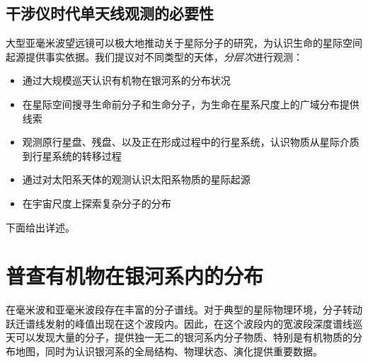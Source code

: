 \documentclass[a4paper]{article}
\begin{document}
\subsection{干涉仪时代单天线观测的必要性}

大型亚毫米波望远镜可以极大地推动关于星际分子的研究，为认识生命的星际空间起源提供事实依据。我们提议对不同类型的天体，\emph{分层次}进行观测：
\begin{itemize}
  \item 通过大规模巡天认识有机物在银河系的分布状况
  \item 在星际空间搜寻生命前分子和生命分子，为生命在星系尺度上的广域分布提供线索
  \item 观测原行星盘、残盘、以及正在形成过程中的行星系统，认识物质从星际介质到行星系统的转移过程
  \item 通过对太阳系天体的观测认识太阳系物质的星际起源
  \item 在宇宙尺度上探索复杂分子的分布
\end{itemize}
下面给出详述。

\section{普查有机物在银河系内的分布}

在毫米波和亚毫米波段存在丰富的分子谱线。对于典型的星际物理环境，分子转动跃迁谱线发射的峰值出现在这个波段内。因此，在这个波段内的宽波段深度谱线巡天可以发现大量的分子，提供独一无二的银河系内分子物质、特别是有机物质的分布地图，同时为认识银河系的全局结构、物理状态、演化提供重要数据。
\end{document}
